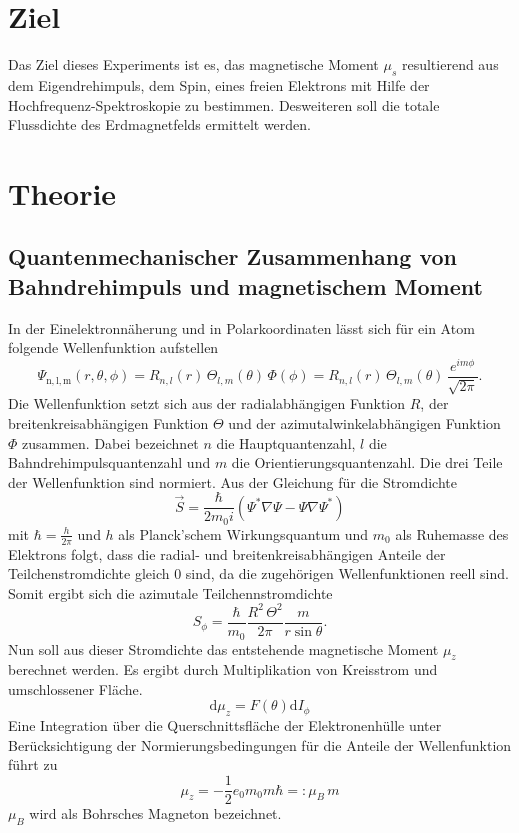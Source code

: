 \section{Ziel}
\label{sec:ziel}
Das Ziel dieses Experiments ist es, das magnetische Moment $\mu_s$ resultierend aus dem Eigendrehimpuls, dem Spin, eines freien Elektrons mit Hilfe der Hochfrequenz-Spektroskopie zu bestimmen. Desweiteren soll die totale Flussdichte des Erdmagnetfelds ermittelt werden.

\section{Theorie}
\label{sec:theorie}
\subsection{Quantenmechanischer Zusammenhang von Bahndrehimpuls und magnetischem Moment}
In der Einelektronnäherung und in Polarkoordinaten lässt sich für ein Atom folgende Wellenfunktion aufstellen
\begin{equation}
\Psi_\mathrm{n,l,m}(r,\theta,\phi) = R_{n,l}(r)\,\Theta_{l,m}(\theta)\,\Phi(\phi) = R_{n,l}(r)\,\Theta_{l,m}(\theta)\,\frac{e^{im\phi}}{\sqrt{2\pi}}.
\end{equation}
Die Wellenfunktion setzt sich aus der radialabhängigen Funktion $R$, der breitenkreisabhängigen Funktion $\Theta$ und der azimutalwinkelabhängigen Funktion $\Phi$ zusammen. Dabei bezeichnet $n$ die Hauptquantenzahl, $l$ die Bahndrehimpulsquantenzahl und $m$ die Orientierungsquantenzahl. Die drei Teile der Wellenfunktion sind normiert. Aus der Gleichung für die Stromdichte
\begin{equation}
  \vec{S}=\frac{\hbar}{2m_0i}(\Psi^* \nabla\Psi-\Psi\nabla\Psi^*)
\end{equation}
mit $\hbar=\frac{h}{2\pi}$ und $h$ als Planck'schem Wirkungsquantum und $m_0$ als Ruhemasse des Elektrons folgt, dass die radial- und breitenkreisabhängigen Anteile der Teilchenstromdichte gleich 0 sind, da die zugehörigen Wellenfunktionen reell sind. Somit ergibt sich die azimutale Teilchennstromdichte
\begin{equation}
  S_\phi = \frac{\hbar}{m_0}\frac{R^2\,\Theta^2}{2\pi}\frac{m}{r\sin\theta}.
\end{equation}
Nun soll aus dieser Stromdichte das entstehende magnetische Moment $\mu_z$ berechnet werden. Es ergibt durch Multiplikation von Kreisstrom und umschlossener Fläche.
\begin{equation}
  \mathrm{d}\mu_z=F(\theta)\mathrm{d}I_\phi
\end{equation}
Eine Integration über die Querschnittsfläche der Elektronenhülle unter Berücksichtigung der Normierungsbedingungen für die Anteile der Wellenfunktion führt zu
\begin{equation}
  \mu_z=-\frac{1}{2}{e_0}{m_0}m\hbar =:\mu_B\,m
\end{equation}
$\mu_B$ wird als Bohrsches Magneton bezeichnet.

